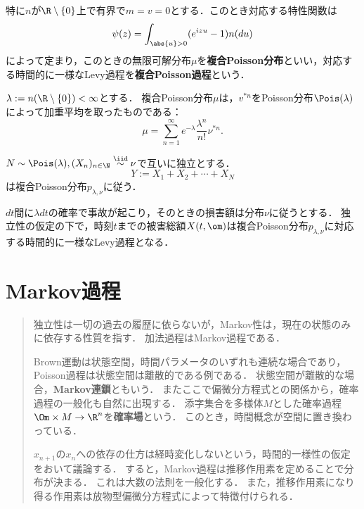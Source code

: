 \documentclass[uplatex,dvipdfmx]{jsreport}
\begin{document}
\begin{definition}
    特に$n$が$\R\setminus\{0\}$上で有界で$m=v=0$とする．このとき対応する特性関数は
    \[\psi(z)=\int_{\abs{u}>0}(e^{izu}-1)n(du)\]
    によって定まり，このときの無限可解分布$\mu$を\textbf{複合Poisson分布}といい，対応する時間的に一様なLevy過程を\textbf{複合Poisson過程}という．
\end{definition}

\begin{lemma}[複合Poisson分布の特徴付け]
    $\lambda:=n(\R\setminus\{0\})<\infty$とする．
    複合Poisson分布$\mu$は，$v^{*n}$をPoisson分布$\Pois(\lambda)$によって加重平均を取ったものである：
    \[\mu=\sum^\infty_{n=1}e^{-\lambda}\frac{\lambda^n}{n!}\nu^{*n}.\]
\end{lemma}

\begin{proposition}
    $N\sim\Pois(\lambda),(X_n)_{n\in\N}\overset{\iid}{\sim}\nu$で互いに独立とする．
    \[Y:=X_1+X_2+\cdots+X_N\]
    は複合Poisson分布$p_{\lambda,\nu}$に従う．
\end{proposition}
\begin{remarks}
    $dt$間に$\lambda dt$の確率で事故が起こり，そのときの損害額は分布$\nu$に従うとする．
    独立性の仮定の下で，時刻$t$までの被害総額$X(t,\om)$は複合Poisson分布$p_{\lambda,\nu}$に対応する時間的に一様なLevy過程となる．
\end{remarks}

\chapter{Markov過程}

\begin{quotation}
    独立性は一切の過去の履歴に依らないが，Markov性は，現在の状態のみに依存する性質を指す．
    加法過程はMarkov過程である．

    Brown運動は状態空間，時間パラメータのいずれも連続な場合であり，Poisson過程は状態空間は離散的である例である．
    状態空間が離散的な場合，\textbf{Markov連鎖}ともいう．
    またここで偏微分方程式との関係から，確率過程の一般化も自然に出現する．
    添字集合を多様体$M$とした確率過程$\Om\times M\to\R^n$を\textbf{確率場}という．
    このとき，時間概念が空間に置き換わっている．

    $x_{n+1}$の$x_n$への依存の仕方は経時変化しないという，時間的一様性の仮定をおいて議論する．
    すると，Markov過程は推移作用素を定めることで分布が決まる．
    これは大数の法則を一般化する．
    また，推移作用素になり得る作用素は放物型偏微分方程式によって特徴付けられる．
\end{quotation}
\end{document}
